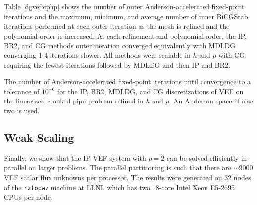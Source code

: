 \documentclass[../doc.tex]{subfiles}
\begin{document}
Table \ref{dgvef:cphp} shows the number of outer Anderson-accelerated fixed-point iterations and the maximum, minimum, and average number of inner BiCGStab iterations performed at each outer iteration as the mesh is refined and the polynomial order is increased. At each refinement and polynomial order, the IP, BR2, and CG methods outer iteration converged equivalently with MDLDG converging 1-4 iterations slower. All methods were scalable in $h$ and $p$ with CG requiring the fewest iterations followed by MDLDG and then IP and BR2. 
\begin{table}
\centering
\caption{The number of Anderson-accelerated fixed-point iterations until convergence to a tolerance of $10^{-6}$ for the IP, BR2, MDLDG, and CG discretizations of VEF on the linearized crooked pipe problem refined in $h$ and $p$. An Anderson space of size two is used.}
\label{dgvef:cphp}
\begin{adjustbox}{max width = \textwidth}

\end{adjustbox}
\end{table}

\subsection{Weak Scaling} \label{dgvef_sec:weak}
Finally, we show that the IP VEF system with $p=2$ can be solved efficiently in parallel on larger problems. The parallel partitioning is such that there are $\sim\!9000$ VEF scalar flux unknowns per processor. The results were generated on 32 nodes of the \texttt{rztopaz} machine at LLNL which has two 18-core Intel Xeon E5-2695 CPUs per node. 
\end{document}
